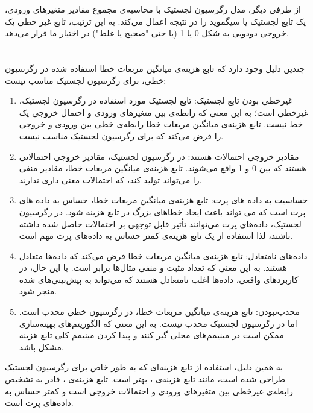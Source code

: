 \documentclass{article}
\begin{document}
از طرفی دیگر، مدل رگرسیون لجستیک با محاسبه‌ی مجموع مقادیر متغیرهای ورودی، یک تابع لجستیک یا سیگموید را در نتیجه اعمال می‌کند. به این ترتیب، تابع غیر خطی یک خروجی دودویی به شکل 0 یا 1 (یا حتی "صحیح یا غلط") در اختیار ما قرار می‌دهد.


\section{}%
چندین دلیل وجود دارد که تابع هزینه‌ی میانگین مربعات خطا استفاده شده در رگرسیون خطی، برای رگرسیون لجستیک مناسب نیست:
\begin{enumerate}
	\item غیرخطی بودن تابع لجستیک: تابع لجستیک مورد استفاده در رگرسیون لجستیک، غیرخطی است؛ به این معنی که رابطه‌ی بین متغیرهای ورودی و احتمال خروجی یک خط نیست. تابع هزینه‌ی میانگین مربعات خطا رابطه‌ی خطی بین ورودی و خروجی را فرض می‌کند که برای رگرسیون لجستیک مناسب نیست.
	\item مقادیر خروجی احتمالات هستند: در رگرسیون لجستیک، مقادیر خروجی احتمالاتی هستند که بین 0 و 1 واقع می‌شوند. تابع هزینه‌ی میانگین مربعات خطا، مقادیر منفی را می‌تواند تولید کند، که احتمالات معنی داری ندارند.
	\item حساسیت به داده های پرت: تابع هزینه‌ی میانگین مربعات خطا، حساس به داده های پرت است که می تواند باعث ایجاد خطاهای بزرگ در تابع هزینه شود. در رگرسیون لجستیک، داده‌های پرت می‌توانند تأثیر قابل توجهی بر احتمالات حاصل شده داشته باشند، لذا استفاده از یک تابع هزینه‌ی کمتر حساس به داده‌های پرت مهم است.
	\item داده‌های نامتعادل: تابع هزینه‌ی میانگین مربعات خطا فرض می‌کند که داده‌ها متعادل هستند. به این معنی که تعداد مثبت و منفی مثال‌ها برابر است. با این حال، در کاربرد‌های واقعی، داده‌ها اغلب نامتعادل هستند که می‌تواند به پیش‌بینی‌های شده منجر شود.
	\item محدب‌نبودن: تابع هزینه‌ی میانگین مربعات خطا، در رگرسیون خطی محدب است. اما در رگرسیون لجستیک محدب نیست. به این معنی که الگوریتم‌های بهینه‌سازی ممکن است در مینیمم‌های محلی گیر کنند و پیدا کردن مینیمم کلی تابع هزینه مشکل باشد.
\end{enumerate}
به همین دلیل، استفاده از تابع هزینه‌ای که به طور خاص برای رگرسیون لجستیک طراحی شده است، مانند تابع هزینه‌ی ، بهتر است. تابع هزینه‌ی  ، قادر به تشخیص رابطه‌ی غیرخطی بین متغیرهای ورودی و احتمالات خروجی است و کمتر حساس به داده‌های پرت است.
\end{document}
